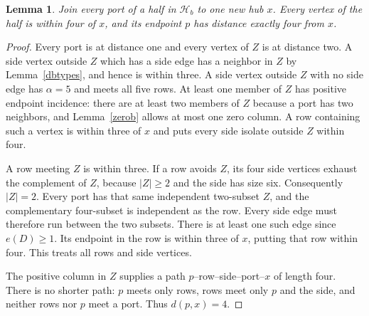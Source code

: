 \documentclass[11pt]{article}
\newtheorem{lemma}[theorem]{Lemma}
\begin{document}
\begin{lemma}\label{hbradius}
Join every port of a half in $\mathcal H_b$ to one new hub $x$.
Every vertex of the half is within four of $x$, and its endpoint
$p$ has distance exactly four from $x$.
\end{lemma}
\begin{proof}
Every port is at distance one and every vertex of $Z$ is at distance
two. A side vertex outside $Z$ which has a side edge has a neighbor
in $Z$ by Lemma~\ref{dbtypes}, and hence is within three. A side vertex
outside $Z$ with no side edge has $\alpha=5$ and meets all five rows.
At least one member of $Z$ has positive endpoint incidence: there are
at least two members of $Z$ because a port has two neighbors, and
Lemma~\ref{zerob} allows at most one zero column. A row containing
such a vertex is within three of $x$ and puts every side isolate
outside $Z$ within four.

A row meeting $Z$ is within three. If a row avoids $Z$, its four
side vertices exhaust the complement of $Z$, because $|Z|\geq2$ and
the side has size six. Consequently $|Z|=2$. Every port has that
same independent two-subset $Z$, and the complementary four-subset
is independent as the row. Every side edge must therefore run between
the two subsets. There is at least one such edge since $e(D)\geq1$.
Its endpoint in the row is within three of $x$, putting that row
within four. This treats all rows and side vertices.

The positive column in $Z$ supplies a path
$p$--row--side--port--$x$ of length four. There is no shorter path:
$p$ meets only rows, rows meet only $p$ and the side, and neither rows
nor $p$ meet a port. Thus $d(p,x)=4$.
\end{proof}
\end{document}
